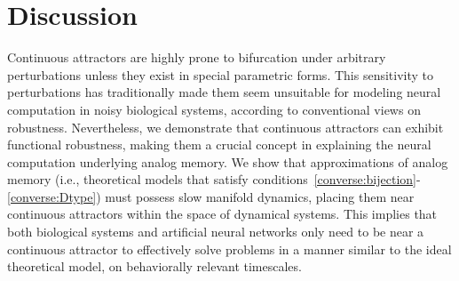 \documentclass{article} %
\newcounter{ct}
\theoremstyle{definition}
\theoremstyle{remark}
\begin{document}
\section{Discussion}
Continuous attractors are highly prone to bifurcation under arbitrary perturbations unless they exist in special parametric forms.
This sensitivity to perturbations has traditionally made them seem unsuitable for modeling neural computation in noisy biological systems, according to conventional views on robustness.
Nevertheless, we demonstrate that continuous attractors can exhibit functional robustness, making them a crucial concept in explaining the neural computation underlying analog memory. 
We show that approximations of analog memory (i.e., theoretical models that satisfy conditions~\ref{converse:bijection}-\ref{converse:Dtype}) must possess slow manifold dynamics, placing them near continuous attractors within the space of dynamical systems.
This implies that both biological systems and artificial neural networks only need to be near a continuous attractor to effectively solve problems in a manner similar to the ideal theoretical model, on behaviorally relevant timescales.

%
\end{document}
